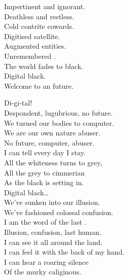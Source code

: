 

Impertinent and ignorant. \\
Deathless and restless. \\
Cold contrite cowards. \\

Digitised satellite. \\
Augmented entities. \\
Unremembered . \\

The world fades to black. \\
Digital black. \\

Welcome to an  future. \\





Di-gi-tal! \\

Despondent, lugubrious, no future. \\
We turned our bodies to computer. \\
We are our own nature abuser. \\

No future, computer, abuser. \\

I can tell every day I stay. \\
All the whiteness turns to grey, \\
All the grey to cimmerian \\
As the black is setting in. \\

Digital black… \\

We've sunken into our illusion. \\
We've fashioned colossal confusion. \\
I am the word of the last . \\

Illusion, confusion, last human. \\

I can see it all around the land. \\
I can feel it with the back of my hand. \\
I can hear a roaring silence \\
Of the murky caliginous. \\

